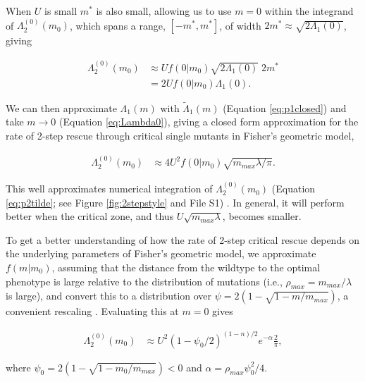 \documentclass[9pt,twocolumn,twoside,lineno]{gsajnl}
\begin{document}
When $U$ is small $m^*$ is also small, allowing us to use $m = 0$ within the integrand of $\Lambda_2^{(0)}(m_0)$, which spans a range, $[-m^*,m^*]$, of width $2m^* \approx  \sqrt{2\Lambda_1(0)}$, giving 

\begin{equation}\label{eq:p20app1}
\begin{aligned}
\Lambda_2^{(0)}(m_0)
&\approx U f(0|m_0)  \sqrt{2\Lambda_1(0)} \; 2m^*\\
&= 2 U f(0|m_0) \Lambda_1(0).
\end{aligned}
\end{equation}

\noindent We can then approximate $\Lambda_1(m)$ with $\tilde{\Lambda}_1(m)$ (Equation \ref{eq:p1closed}) and take $m\rightarrow0$ (Equation \ref{eq:Lambda0}), giving a closed form approximation for the rate of 2-step rescue through critical single mutants in Fisher's geometric model,

\begin{equation}\label{eq:p20app}
\begin{aligned}
\Lambda_2^{(0)}(m_0)
&\approx 4 U^2 f(0|m_0)  \sqrt{m_{max} \lambda/ \pi}.
\end{aligned}
\end{equation}

\noindent This well approximates numerical integration of $\Lambda_2^{(0)}(m_0)$  (Equation \ref{eq:p2tilde}; see Figure \ref{fig:2stepstyle} and File S1) .
In general, it will perform better when the critical zone, and thus $U \sqrt{m_{max} \lambda}$, becomes smaller.

To get a better understanding of how the rate of 2-step critical rescue depends on the underlying parameters of Fisher's geometric model, we approximate $f(m|m_0)$, assuming that the distance from the wildtype to the optimal phenotype is large relative to the distribution of mutations (i.e., $\rho_{max} = m_{max}/\lambda$ is large), and convert this to a distribution over $\psi = 2(1-\sqrt{1-m/m_{max}})$, a convenient rescaling \citep[for details see File S1 and][]{Anciaux2018}.
Evaluating this at $m=0$ gives

\begin{equation}\label{eq:p20app2}
\begin{aligned}
\Lambda_2^{(0)}(m_0)
&\approx U^2 (1-\psi_0/2)^{(1-n)/2} e^{-\alpha} \frac{2}{\pi},
\end{aligned}
\end{equation}

\noindent where $\psi_0 = 2(1-\sqrt{1-m_0/m_{max}})<0$ and $\alpha = \rho_{max} \psi_0^2/4$.
\end{document}
